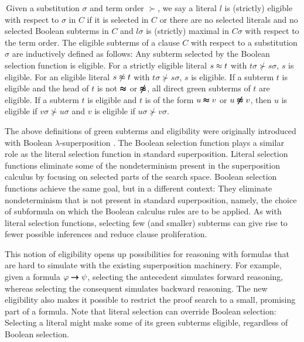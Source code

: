 \documentclass[smallcondensed,draft]{svjour3}     %
\begin{document}
\begin{definition}[Eligibility]
  \,Given a substitution $\sigma$ and term order $\succ$, we say a literal $l$
  is (strictly) eligible with respect to $\sigma$ in $C$ if it is selected in
  $C$ or there are no selected literals and no selected Boolean subterms in
  $C$ and $l\sigma$ is (strictly) maximal in $C\sigma$ with respect to the
  term order.
%
  The eligible subterms of a clause $C$ with respect to a substitution
  $\sigma$ are inductively defined as follows:
  Any subterm selected by the Boolean selection function is eligible.
  For a strictly eligible literal $s \approx t$ with $t\sigma \not\succ
  s\sigma$, $s$ is eligible. For an eligible literal $s \not\approx t$ with
  $t\sigma \not\succ s\sigma$, $s$ is eligible. If a subterm $t$ is eligible
  and the head of $t$ is not $\pmb\approx$ or $\pmb{\not\approx}$, all direct green subterms of
  $t$ are eligible. If a subterm $t$ is eligible and $t$ is of the form $u
  \pmb\approx v$ or $u \pmb{\not\approx} v$, then $u$ is eligible if $v\sigma \not\succ u\sigma$
  and $v$ is eligible if $u\sigma \not\succ v\sigma$.
\end{definition}

The above definitions of green subterms and eligibility were originally introduced
with Boolean $\lambda$-superposition \cite{bbtv-21-full-ho-sup}.
The Boolean selection function plays a similar role as the literal
selection function in standard superposition.
Literal selection functions eliminate some of the nondeterminism present in the superposition
calculus by focusing on selected parts of the search space. Boolean selection functions achieve
the same goal, but in a different context: They eliminate nondeterminism that is not
present in standard superposition, namely, the choice of subformula on which 
the Boolean calculus rules are to be applied. As with literal selection functions,
selecting few (and smaller) subterms can give rise to fewer possible inferences
and reduce clause proliferation.

%
This notion of eligibility opens up possibilities for reasoning with
formulas that are hard to simulate with the existing superposition machinery.
For example, given a formula $\varphi \pmb\rightarrow \psi$, selecting the antecedent
simulates forward reasoning, whereas selecting the consequent simulates backward
reasoning. The new eligibility also makes it possible to restrict the proof
search to a small, promising part of a formula. Note that
literal selection can override Boolean selection: Selecting a literal 
might make some of its green subterms eligible, regardless
of Boolean selection.
\end{document}
